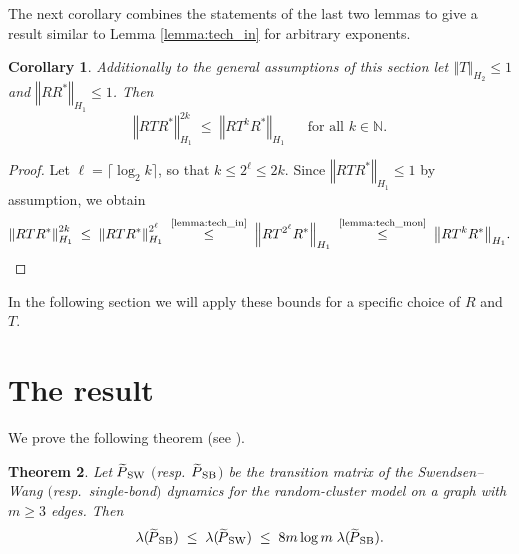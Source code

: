 \documentclass{dis}
\newtheorem{theorem}{Theorem}[chapter]
\newtheorem{corollary}[theorem]{Corollary}
\theoremstyle{citing}
\begin{document}
The next corollary combines the statements of the last two lemmas to give 
a result similar to Lemma \ref{lemma:tech_in} for arbitrary exponents.

\begin{corollary} \label{coro:tech}
Additionally to the general assumptions of this section let 
${\left\Vert {T} \right\Vert}_{{H_2}}\le1$ and ${\left\Vert {R R^*} \right\Vert}_{{H_1}}\le1$. Then
\[
{\left\Vert {R T R^*} \right\Vert}_{{H_1}}^{2 k} \;\le\; {\left\Vert {R T^k R^*} \right\Vert}_{{H_1}}
\; \quad \text{ for all } k\in{\ensuremath{\mathbb{N}}}.
\]
\end{corollary}

\begin{proof}
Let $\ell=\lceil\log_2 k \rceil$, so that $k\le2^\ell\le 2k$.
Since ${\left\Vert {R T R^*} \right\Vert}_{{H_1}}\le1$ by assumption, we obtain 
\[
{\left\Vert {R T R^*} \right\Vert}_{{H_1}}^{2 k} \;\le\; {\left\Vert {R T R^*} \right\Vert}_{{H_1}}^{2^\ell} 
\;\stackrel{\text{\scriptsize \ref{lemma:tech_in}}}{\le}\; 
	{\left\Vert {R T^{2^\ell}  R^*} \right\Vert}_{{H_1}}
\;\stackrel{\text{\scriptsize \ref{lemma:tech_mon}}}{\le}\; 
	{\left\Vert {R T^k  R^*} \right\Vert}_{{H_1}}.
\]
\end{proof}

In the following section
we will apply these bounds for a specific 
choice of $R$ and $T$.

\vspace{2mm}

\section{The result} \label{sec:4_result}

We prove the following theorem (see \cite{U4,U3}).

\begin{theorem} \label{th:main-SB}
Let ${{\raisebox{2pt}{ ${\widetilde{{}}}$ }\mkern-14mu P}_{\rm SW}}$ $($resp.~${{\raisebox{2pt}{ ${\widetilde{{}}}$ }\mkern-14mu P}_{\rm SB}}$$)$ be the transition matrix of the 
Swendsen--Wang $($resp.~single-bond$)$ dynamics for the 
random-cluster model on a graph with $m \ge 3$ edges. Then 
\[
\lambda({{\raisebox{2pt}{ ${\widetilde{{}}}$ }\mkern-14mu P}_{\rm SB}}) \;\le\; \lambda({{\raisebox{2pt}{ ${\widetilde{{}}}$ }\mkern-14mu P}_{\rm SW}}) \;\le\; 8 m \log m\; \lambda({{\raisebox{2pt}{ ${\widetilde{{}}}$ }\mkern-14mu P}_{\rm SB}}).
\]
\end{theorem}
\vspace*{3mm}
\end{document}

